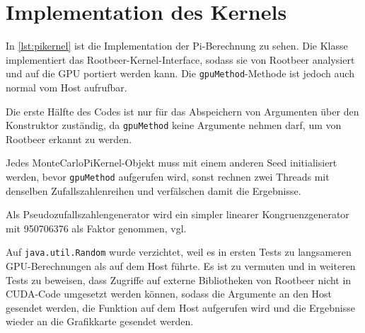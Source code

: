 \section{Implementation des Kernels}

In \autoref{lst:pikernel} ist die Implementation der Pi-Berechnung zu sehen.
Die Klasse implementiert das Rootbeer-Kernel-Interface, sodass sie von Rootbeer analysiert und auf die GPU portiert werden kann.
Die \lstinline!gpuMethod!-Methode ist jedoch auch normal vom Host aufrufbar.

Die erste Hälfte des Codes ist nur für das Abspeichern von Argumenten über den Konstruktor zuständig, da \lstinline!gpuMethod! keine Argumente nehmen darf, um von Rootbeer erkannt zu werden.

Jedes MonteCarloPiKernel-Objekt muss mit einem anderen Seed initialisiert werden, bevor \lstinline!gpuMethod! aufgerufen wird, sonst rechnen zwei Threads mit denselben Zufallszahlenreihen und verfälschen damit die Ergebnisse.

Als Pseudozufallszahlengenerator wird ein simpler linearer Kongruenzgenerator mit 950706376 als Faktor genommen, vgl. \cite{fishman82,fishman86}

Auf \lstinline!java.util.Random! wurde verzichtet, weil es in ersten Tests zu langsameren GPU-Berechnungen als auf dem Host führte. Es ist zu vermuten und in weiteren Tests zu beweisen, dass Zugriffe auf externe Bibliotheken von Rootbeer nicht in CUDA-Code umgesetzt werden können, sodass die Argumente an den Host gesendet werden, die Funktion auf dem Host aufgerufen wird und die Ergebnisse wieder an die Grafikkarte gesendet werden.


